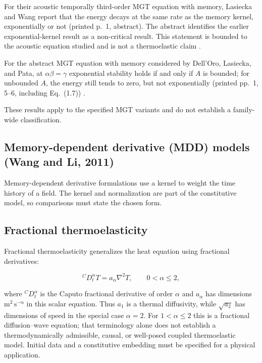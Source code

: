 For their acoustic temporally third-order MGT equation with memory, Lasiecka and Wang report that the energy decays at the same rate as the memory kernel, exponentially or not (printed p.~1, abstract). The abstract identifies the earlier exponential-kernel result as a non-critical result. This statement is bounded to the acoustic equation studied and is not a thermoelastic claim \cite{LasieckaWang2015MGT}.

For the abstract MGT equation with memory considered by Dell'Oro, Lasiecka, and Pata, at $\alpha\beta=\gamma$ exponential stability holds if and only if $A$ is bounded; for unbounded $A$, the energy still tends to zero, but not exponentially (printed pp.~1, 5--6, including Eq.~(1.7)) \cite{DellOroLasieckaPata2016MGT}.

These results apply to the specified MGT variants and do not establish a family-wide classification.

\subsection{Memory-dependent derivative (MDD) models (Wang and Li, 2011)}
\label{sec:4.10}

Memory-dependent derivative formulations use a kernel to weight the time history of a field. The kernel and normalization are part of the constitutive model, so comparisons must state the chosen form.

\subsection{Fractional thermoelasticity}
\label{sec:4.11}

Fractional thermoelasticity generalizes the heat equation using fractional derivatives:

\begin{equation}
{}^C D_t^\alpha T = a_\alpha\nabla^2 T, \qquad 0 < \alpha \leq 2,
\label{eq:4.20}
\end{equation}

where ${}^C D_t^\alpha$ is the Caputo fractional derivative of order $\alpha$ and $a_\alpha$ has dimensions $\mathrm{m^2\,s^{-\alpha}}$ in this scalar equation. Thus $a_1$ is a thermal diffusivity, while $\sqrt{a_2}$ has dimensions of speed in the special case $\alpha=2$. For $1<\alpha\leq2$ this is a fractional diffusion--wave equation; that terminology alone does not establish a thermodynamically admissible, causal, or well-posed coupled thermoelastic model. Initial data and a constitutive embedding must be specified for a physical application.

